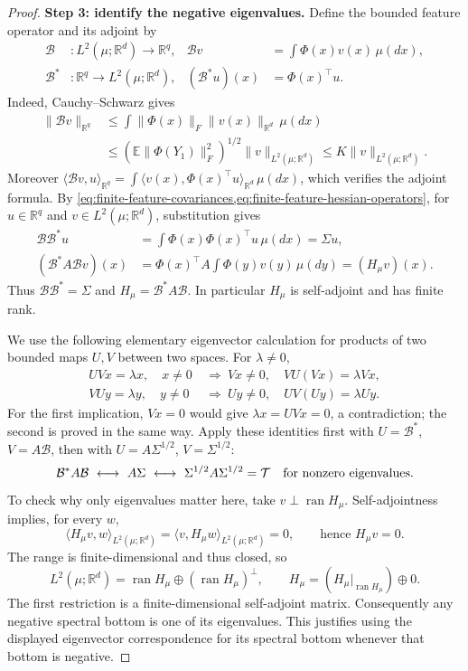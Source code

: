 \begin{proof}
\par\noindent\textbf{Step 3: identify the negative eigenvalues.}
Define the bounded feature operator and its adjoint by
\[
 \begin{aligned}
 \mathcal B &:L^2(\mu;\mathbb R^d)\to\mathbb R^q,
 &\mathcal Bv&=\int\Phi(x)v(x)\,\mu(dx),\\
 \mathcal B^* &:\mathbb R^q\to L^2(\mu;\mathbb R^d),
 &(\mathcal B^*u)(x)&=\Phi(x)^\top u.
 \end{aligned}
\]
Indeed, Cauchy--Schwarz gives
\begin{align*}
 \|\mathcal Bv\|_{\mathbb R^q}
 &\le\int\|\Phi(x)\|_F\|v(x)\|_{\mathbb R^d}\,\mu(dx)\\
 &\le(\mathbb E\|\Phi(Y_1)\|_F^2)^{1/2}\|v\|_{L^2(\mu;\mathbb R^d)}
 \le K\|v\|_{L^2(\mu;\mathbb R^d)}.
\end{align*}
Moreover
$\langle\mathcal Bv,u\rangle_{\mathbb R^q}
=\int\langle v(x),\Phi(x)^\top u\rangle_{\mathbb R^d}\,\mu(dx)$,
which verifies the adjoint formula. By
\cref{eq:finite-feature-covariances,eq:finite-feature-hessian-operators},
for $u\in\mathbb R^q$ and $v\in L^2(\mu;\mathbb R^d)$, substitution gives
\begin{align*}
 \mathcal B\mathcal B^*u
 &=\int\Phi(x)\Phi(x)^\top u\,\mu(dx)=\Sigma u,\\
 (\mathcal B^*A\mathcal Bv)(x)
 &=\Phi(x)^\top A\int\Phi(y)v(y)\,\mu(dy)=(H_\mu v)(x).
\end{align*}
Thus $\mathcal B\mathcal B^*=\Sigma$ and
$H_\mu=\mathcal B^*A\mathcal B$.
In particular $H_\mu$ is self-adjoint and has finite rank.

We use the following elementary eigenvector calculation for products of
two bounded maps $U,V$ between two spaces. For $\lambda\ne0$,
\begin{align*}
 UVx=\lambda x,\quad x\ne0
 &\ \Longrightarrow\
 Vx\ne0,\quad VU(Vx)=\lambda Vx,\\
 VUy=\lambda y,\quad y\ne0
 &\ \Longrightarrow\
 Uy\ne0,\quad UV(Uy)=\lambda Uy.
\end{align*}
For the first implication, $Vx=0$ would give $\lambda x=UVx=0$,
a contradiction; the second is proved in the same way.
Apply these identities first with $U=\mathcal B^*$, $V=A\mathcal B$,
then with $U=A\Sigma^{1/2}$, $V=\Sigma^{1/2}$:
\[
 \mathcal B^*A\mathcal B
 \ \longleftrightarrow\ A\Sigma
 \ \longleftrightarrow\ \Sigma^{1/2}A\Sigma^{1/2}=\mathcal T
 \quad\hbox{for nonzero eigenvalues}.
\]
To check why only eigenvalues matter here, take
$v\perp\operatorname{ran}H_\mu$. Self-adjointness implies, for every $w$,
\[
 \langle H_\mu v,w\rangle_{L^2(\mu;\mathbb R^d)}
 =\langle v,H_\mu w\rangle_{L^2(\mu;\mathbb R^d)}=0,
 \qquad\text{hence }H_\mu v=0.
\]
The range is finite-dimensional and thus closed, so
\[
 L^2(\mu;\mathbb R^d)
 =\operatorname{ran}H_\mu\oplus(\operatorname{ran}H_\mu)^\perp,
 \qquad
 H_\mu=(H_\mu|_{\operatorname{ran}H_\mu})\oplus0.
\]
The first restriction is a finite-dimensional self-adjoint matrix.
Consequently any negative spectral bottom is one of its eigenvalues.
This justifies
using the displayed eigenvector correspondence for its spectral bottom
whenever that bottom is negative.


\end{proof}
